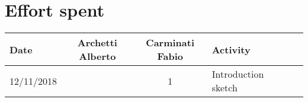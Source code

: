 
\section{Effort spent}

\label{sec:effort}

\begin{table}[h!]

\centering

\begin{tabularx}{\linewidth}{|l|c|c|X|Xl}

\hline

\textbf{Date}  & \textbf{Archetti Alberto} & \textbf{Carminati Fabio} & \textbf{Activity}                                \\

\hline

12/11/2018  &  & 1 & Introduction sketch                                             \\

\hline

\end{tabularx}

\end{table}
